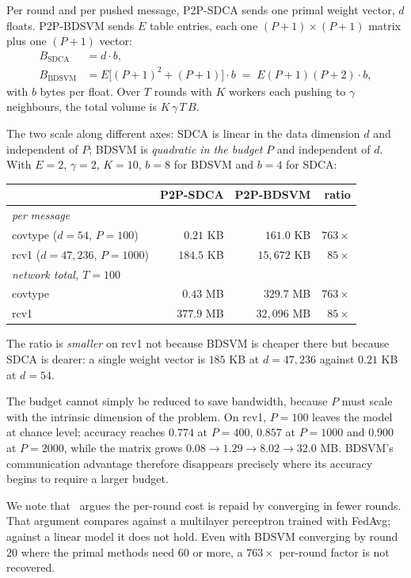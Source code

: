 Per round and per pushed message, P2P-SDCA sends one primal weight vector,
$d$ floats. P2P-BDSVM sends $E$ table entries, each one $(P+1)\times(P+1)$
matrix plus one $(P+1)$ vector:
\begin{align}
  B_{\text{SDCA}}  &= d \cdot b, \\
  B_{\text{BDSVM}} &= E\bigl[(P+1)^2 + (P+1)\bigr] \cdot b
                    \;=\; E(P+1)(P+2)\cdot b ,
\end{align}
with $b$ bytes per float. Over $T$ rounds with $K$ workers each pushing to
$\gamma$ neighbours, the total volume is $K\,\gamma\,T\,B$.

The two scale along different axes: SDCA is linear in the data dimension $d$ and
independent of $P$; BDSVM is \emph{quadratic in the budget} $P$ and independent
of $d$. With $E=2$, $\gamma=2$, $K=10$, $b=8$ for BDSVM and $b=4$ for SDCA:

\begin{center}
\begin{tabular}{lrrr}
\hline
& P2P-SDCA & P2P-BDSVM & ratio \\
\hline
\multicolumn{4}{l}{\emph{per message}} \\
\quad covtype ($d{=}54$, $P{=}100$)     & $0.21$ KB  & $161.0$ KB    & $763\times$ \\
\quad rcv1 ($d{=}47{,}236$, $P{=}1000$) & $184.5$ KB & $15{,}672$ KB & $85\times$ \\
\multicolumn{4}{l}{\emph{network total, $T = 100$}} \\
\quad covtype                            & $0.43$ MB  & $329.7$ MB    & $763\times$ \\
\quad rcv1                               & $377.9$ MB & $32{,}096$ MB & $85\times$ \\
\hline
\end{tabular}
\end{center}

\noindent The ratio is \emph{smaller} on rcv1 not because BDSVM is cheaper there
but because SDCA is dearer: a single weight vector is $185$ KB at $d = 47{,}236$
against $0.21$ KB at $d = 54$.

The budget cannot simply be reduced to save bandwidth, because $P$ must scale
with the intrinsic dimension of the problem. On rcv1, $P = 100$ leaves the model
at chance level; accuracy reaches $0.774$ at $P = 400$, $0.857$ at $P = 1000$
and $0.900$ at $P = 2000$, while the matrix grows
$0.08 \to 1.29 \to 8.02 \to 32.0$ MB. BDSVM's communication advantage therefore
disappears precisely where its accuracy begins to require a larger budget.

We note that~\cite{navia2022bdsvm} argues the per-round cost is repaid by
converging in fewer rounds. That argument compares against a multilayer
perceptron trained with FedAvg; against a linear model it does not hold. Even
with BDSVM converging by round $20$ where the primal methods need $60$ or more,
a $763\times$ per-round factor is not recovered.
